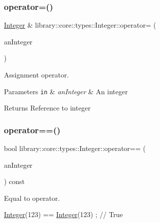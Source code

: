 \subsubsection{\texorpdfstring{operator=()}{operator=()}}
{\footnotesize\ttfamily \hyperlink{classlibrary_1_1core_1_1types_1_1_integer}{Integer} \& library\+::core\+::types\+::\+Integer\+::operator= (\begin{DoxyParamCaption}\item[{Integer\+::\+Value\+Type}]{an\+Integer }\end{DoxyParamCaption})}



Assignment operator. 


\begin{DoxyParams}[1]{Parameters}
\mbox{\tt in}  & {\em an\+Integer} & An integer \\
\hline
\end{DoxyParams}
\begin{DoxyReturn}{Returns}
Reference to integer 
\end{DoxyReturn}
\mbox{\label{classlibrary_1_1core_1_1types_1_1_integer_a52b3a012d6c6779773d051800daac516}} 
\subsubsection{\texorpdfstring{operator==()}{operator==()}\hspace{0.1cm}{\footnotesize\ttfamily [1/2]}}
{\footnotesize\ttfamily bool library\+::core\+::types\+::\+Integer\+::operator== (\begin{DoxyParamCaption}\item[{const \hyperlink{classlibrary_1_1core_1_1types_1_1_integer}{Integer} \&}]{an\+Integer }\end{DoxyParamCaption}) const}



Equal to operator. 


\begin{DoxyCode}
\hyperlink{classlibrary_1_1core_1_1types_1_1_integer_a6483b1c4e13e5ed6af5e7a58347efead}{Integer}(123) == \hyperlink{classlibrary_1_1core_1_1types_1_1_integer_a6483b1c4e13e5ed6af5e7a58347efead}{Integer}(123) ; \textcolor{comment}{// True}
\end{DoxyCode}



